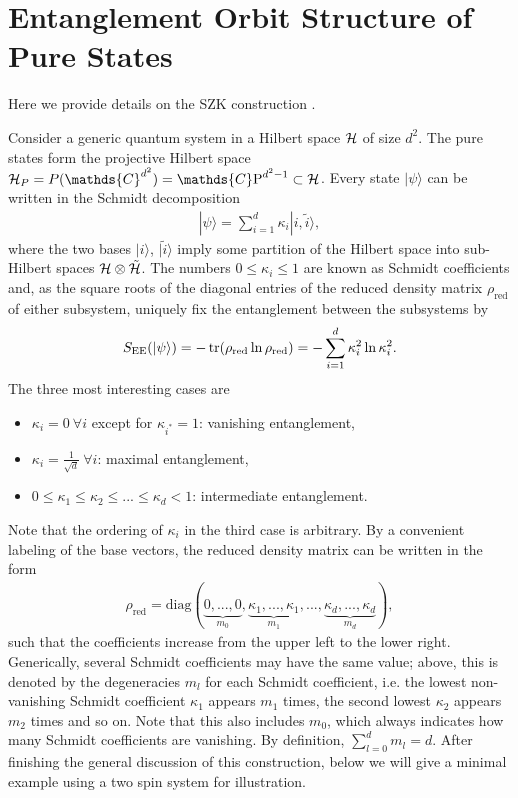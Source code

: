 \documentclass[a4paper,11pt]{article}
\newcommand{\CP}[1]{\mathds{C}\text{P}^{#1}}
\newcommand{\1}{\mathds{1}}
\begin{document}
\section{Entanglement Orbit Structure of Pure States}
\label{app:OrbitStructurePureStates}

Here we provide details on the SZK construction \cite{Sinolecka2002manifolds}.

Consider a generic quantum system in a Hilbert space $\cal H$ of size $d^2$. The pure states form the projective Hilbert space ${\cal H}_P=P(\mathds{C}^{d^2})=\CP{d^2-1}\subset{\cal H}$. Every state $|\psi\rangle$ can be written in the Schmidt decomposition
\begin{align}
    |\psi\rangle=\sum_{i=1}^d\kappa_i|i,\tilde{i}\rangle,\label{eq:schmidt_decomposed_state}
\end{align}
where the two bases $|i\rangle$, $|\tilde{i}\rangle$ imply some partition of the Hilbert space into sub-Hilbert spaces ${\cal H}\otimes\tilde{\cal H}$. The numbers $0\leq\kappa_i\leq1$ are known as Schmidt coefficients and, as the square roots of the diagonal entries of the reduced density matrix $\rho_{\text{red}}$ of either subsystem, uniquely fix the entanglement between the subsystems by
\begin{align}
    S_{\text{EE}}(|\psi\rangle)=-\tr(\rho_{\text{red}}\ln\rho_{\text{red}})=-\sum_{i=1}^d\kappa_i^2\ln\kappa_i^2.\label{eq:entanglement_entropy}
\end{align}
The three most interesting cases are
\begin{itemize}
    \item $\kappa_i=0~\forall i$ except for $\kappa_{i^\ast}=1$: vanishing entanglement,
    \item $\kappa_i=\frac{1}{\sqrt{d}}~\forall i$: maximal entanglement,
    \item $0\leq\kappa_1\leq\kappa_2\leq...\leq\kappa_d<1$: intermediate entanglement.
\end{itemize}
Note that the ordering of $\kappa_i$ in the third case is arbitrary. By a convenient labeling of the base vectors, the reduced density matrix can be written in the form
\begin{align}
    \rho_{\text{red}}=\text{diag}(\underbrace{0,...,0}_{m_0},\underbrace{\kappa_1,...,\kappa_1}_{m_1},...,\underbrace{\kappa_d,...,\kappa_d}_{m_d}),
\end{align}
such that the coefficients increase from the upper left to the lower right. Generically, several Schmidt coefficients may have the same value; above, this is denoted by the degeneracies $m_l$ for each Schmidt coefficient, i.e. the lowest non-vanishing Schmidt coefficient $\kappa_1$ appears $m_1$ times, the second lowest $\kappa_2$ appears $m_2$ times and so on. Note that this also includes $m_0$, which always indicates how many Schmidt coefficients are vanishing. By definition, $\sum_{l=0}^dm_l=d$. After finishing the general discussion of this construction, below we will give a minimal example using a two spin system for illustration.
\end{document}
